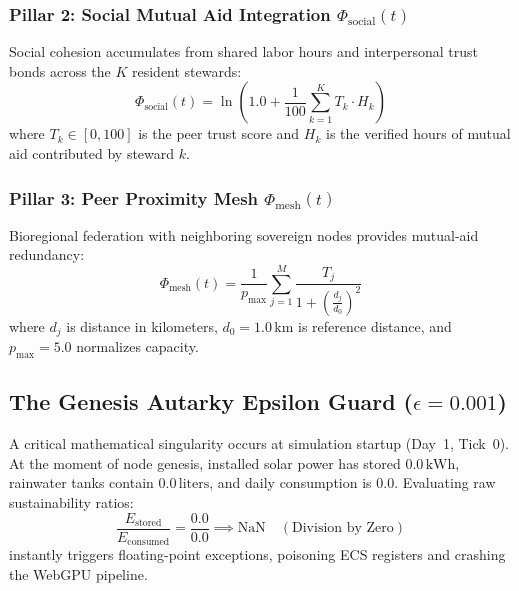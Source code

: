 \subsubsection{Pillar 2: Social Mutual Aid Integration \texorpdfstring{$\Phi_{\mathrm{social}}(t)$}{Phi\_social(t)}}
Social cohesion accumulates from shared labor hours and interpersonal trust bonds across the $K$ resident stewards:
\begin{equation}
\Phi_{\mathrm{social}}(t) = \ln\left( 1.0 + \frac{1}{100} \sum_{k=1}^K T_k \cdot H_k \right)
\label{eq:phi_social}
\end{equation}
where $T_k \in [0, 100]$ is the peer trust score and $H_k$ is the verified hours of mutual aid contributed by steward $k$.

\subsubsection{Pillar 3: Peer Proximity Mesh \texorpdfstring{$\Phi_{\mathrm{mesh}}(t)$}{Phi\_mesh(t)}}
Bioregional federation with neighboring sovereign nodes provides mutual-aid redundancy:
\begin{equation}
\Phi_{\mathrm{mesh}}(t) = \frac{1}{p_{\max}} \sum_{j=1}^M \frac{T_j}{1 + \left( \frac{d_j}{d_0} \right)^2}
\label{eq:phi_mesh}
\end{equation}
where $d_j$ is distance in kilometers, $d_0 = 1.0\,\mathrm{km}$ is reference distance, and $p_{\max} = 5.0$ normalizes capacity.

\subsection{The Genesis Autarky Epsilon Guard \texorpdfstring{($\epsilon = 0.001$)}{(epsilon = 0.001)}}
A critical mathematical singularity occurs at simulation startup (Day~1, Tick~0). At the moment of node genesis, installed solar power has stored $0.0\,\mathrm{kWh}$, rainwater tanks contain $0.0\,\mathrm{liters}$, and daily consumption is $0.0$. Evaluating raw sustainability ratios:
\begin{equation}
\frac{E_{\mathrm{stored}}}{E_{\mathrm{consumed}}} = \frac{0.0}{0.0} \implies \text{NaN} \quad (\text{Division by Zero})
\label{eq:nan_singularity}
\end{equation}
instantly triggers floating-point exceptions, poisoning ECS registers and crashing the WebGPU pipeline.

